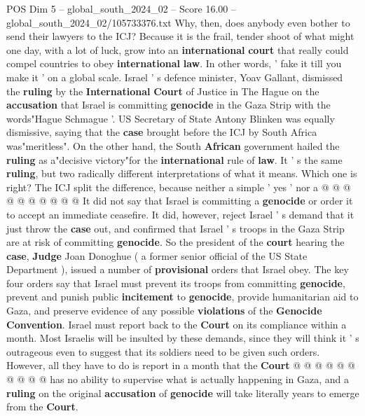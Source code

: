 \begin{textsample}{POS Dim 5 – global\_south\_2024\_02 – Score 16.00 – global\_south\_2024\_02/105733376.txt}  \label{ex:f5_pos_154}
Why, then, does anybody even bother to send their lawyers to the ICJ?
Because it is the frail, tender shoot of what might one day, with a lot of luck, grow into an \textbf{international} \textbf{court} that really could compel countries to obey \textbf{international} \textbf{law}.
In other words, ' fake it till you make it ' on a global scale.
Israel ' s defence minister, Yoav Gallant, dismissed the \textbf{ruling} by the \textbf{International} \textbf{Court} of Justice in The Hague on the \textbf{accusation} that Israel is committing \textbf{genocide} in the Gaza Strip with the words"Hague Schmague '.
US Secretary of State Antony Blinken was equally dismissive, saying that the \textbf{case} brought before the ICJ by South Africa was"meritless".
On the other hand, the South \textbf{African} government hailed the \textbf{ruling} as a"decisive victory"for the \textbf{international} rule of \textbf{law}.
It ' s the same \textbf{ruling}, but two radically different interpretations of what it means.
Which one is right?
The ICJ split the difference, because neither a simple ' yes ' nor a @ @ @ @ @ @ @ @ @ @ It did not say that Israel is committing a \textbf{genocide} or order it to accept an immediate ceasefire.
It did, however, reject Israel ' s demand that it just throw the \textbf{case} out, and confirmed that Israel ' s troops in the Gaza Strip are at risk of committing \textbf{genocide}.
So the president of the \textbf{court} hearing the \textbf{case}, \textbf{Judge} Joan Donoghue ( a former senior official of the US State Department ), issued a number of \textbf{provisional} orders that Israel obey.
The key four orders say that Israel must prevent its troops from committing \textbf{genocide}, prevent and punish public \textbf{incitement} to \textbf{genocide}, provide humanitarian aid to Gaza, and preserve evidence of any possible \textbf{violations} of the \textbf{Genocide} \textbf{Convention}.
Israel must report back to the \textbf{Court} on its compliance within a month.
Most Israelis will be insulted by these demands, since they will think it ' s outrageous even to suggest that its soldiers need to be given such orders.
However, all they have to do is report in a month that the \textbf{Court} @ @ @ @ @ @ @ @ @ @ has no ability to supervise what is actually happening in Gaza, and a \textbf{ruling} on the original \textbf{accusation} of \textbf{genocide} will take literally years to emerge from the \textbf{Court}.

\end{textsample}
